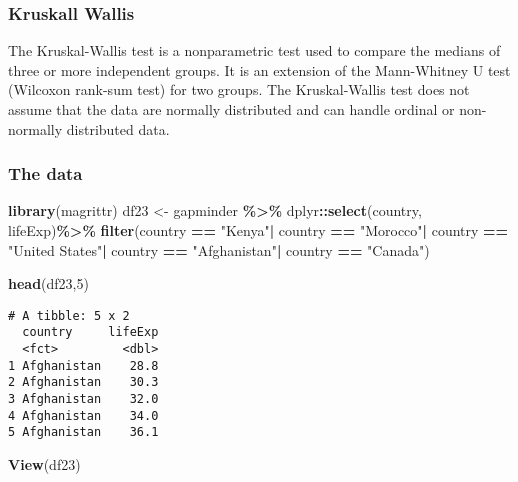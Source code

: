 \documentclass[
]{article}
\newenvironment{Shaded}{\begin{snugshade}}{\end{snugshade}}
\newcommand{\DecValTok}[1]{\textcolor[rgb]{0.00,0.00,0.81}{#1}}
\newcommand{\FunctionTok}[1]{\textcolor[rgb]{0.13,0.29,0.53}{\textbf{#1}}}
\newcommand{\NormalTok}[1]{#1}
\newcommand{\OtherTok}[1]{\textcolor[rgb]{0.56,0.35,0.01}{#1}}
\newcommand{\SpecialCharTok}[1]{\textcolor[rgb]{0.81,0.36,0.00}{\textbf{#1}}}
\newcommand{\StringTok}[1]{\textcolor[rgb]{0.31,0.60,0.02}{#1}}
\begin{document}
\hypertarget{kruskall-wallis}{%
\subsubsection{Kruskall Wallis}\label{kruskall-wallis}}

The Kruskal-Wallis test is a nonparametric test used to compare the
medians of three or more independent groups. It is an extension of the
Mann-Whitney U test (Wilcoxon rank-sum test) for two groups. The
Kruskal-Wallis test does not assume that the data are normally
distributed and can handle ordinal or non-normally distributed data.

\hypertarget{the-data-1}{%
\subsubsection{The data}\label{the-data-1}}

\begin{Shaded}
\begin{Highlighting}[]
\FunctionTok{library}\NormalTok{(magrittr)}
\NormalTok{df23 }\OtherTok{\textless{}{-}}\NormalTok{ gapminder }\SpecialCharTok{\%\textgreater{}\%}
\NormalTok{  dplyr}\SpecialCharTok{::}\FunctionTok{select}\NormalTok{(country, lifeExp)}\SpecialCharTok{\%\textgreater{}\%}
  \FunctionTok{filter}\NormalTok{(country }\SpecialCharTok{==} \StringTok{"Kenya"}\SpecialCharTok{|}
\NormalTok{           country }\SpecialCharTok{==} \StringTok{"Morocco"}\SpecialCharTok{|}
\NormalTok{           country }\SpecialCharTok{==} \StringTok{"United States"}\SpecialCharTok{|}
\NormalTok{           country }\SpecialCharTok{==} \StringTok{"Afghanistan"}\SpecialCharTok{|}
\NormalTok{           country }\SpecialCharTok{==} \StringTok{"Canada"}\NormalTok{)}

\FunctionTok{head}\NormalTok{(df23,}\DecValTok{5}\NormalTok{)}
\end{Highlighting}
\end{Shaded}

\begin{verbatim}
# A tibble: 5 x 2
  country     lifeExp
  <fct>         <dbl>
1 Afghanistan    28.8
2 Afghanistan    30.3
3 Afghanistan    32.0
4 Afghanistan    34.0
5 Afghanistan    36.1
\end{verbatim}

\begin{Shaded}
\begin{Highlighting}[]
\FunctionTok{View}\NormalTok{(df23)}
\end{Highlighting}
\end{Shaded}
\end{document}
